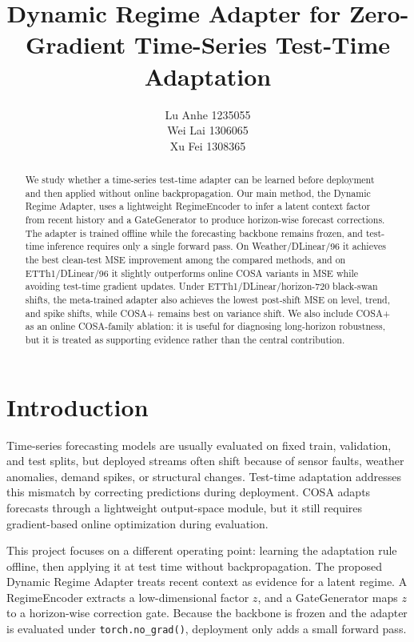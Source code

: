 \documentclass[10pt]{article}
\title{Dynamic Regime Adapter for Zero-Gradient Time-Series Test-Time Adaptation}
\author{Lu Anhe 1235055 \\ Wei Lai 1306065 \\ Xu Fei 1308365}
\date{}
\begin{document}
\maketitle

\begin{abstract}
We study whether a time-series test-time adapter can be learned before deployment and then applied without online backpropagation. Our main method, the Dynamic Regime Adapter, uses a lightweight RegimeEncoder to infer a latent context factor from recent history and a GateGenerator to produce horizon-wise forecast corrections. The adapter is trained offline while the forecasting backbone remains frozen, and test-time inference requires only a single forward pass. On Weather/DLinear/96 it achieves the best clean-test MSE improvement among the compared methods, and on ETTh1/DLinear/96 it slightly outperforms online COSA variants in MSE while avoiding test-time gradient updates. Under ETTh1/DLinear/horizon-720 black-swan shifts, the meta-trained adapter also achieves the lowest post-shift MSE on level, trend, and spike shifts, while COSA+ remains best on variance shift. We also include COSA+ as an online COSA-family ablation: it is useful for diagnosing long-horizon robustness, but it is treated as supporting evidence rather than the central contribution.
\end{abstract}

\section{Introduction}
Time-series forecasting models are usually evaluated on fixed train, validation, and test splits, but deployed streams often shift because of sensor faults, weather anomalies, demand spikes, or structural changes. Test-time adaptation addresses this mismatch by correcting predictions during deployment. COSA adapts forecasts through a lightweight output-space module, but it still requires gradient-based online optimization during evaluation.

This project focuses on a different operating point: learning the adaptation rule offline, then applying it at test time without backpropagation. The proposed Dynamic Regime Adapter treats recent context as evidence for a latent regime. A RegimeEncoder extracts a low-dimensional factor $z$, and a GateGenerator maps $z$ to a horizon-wise correction gate. Because the backbone is frozen and the adapter is evaluated under \texttt{torch.no\_grad()}, deployment only adds a small forward pass.
\end{document}
